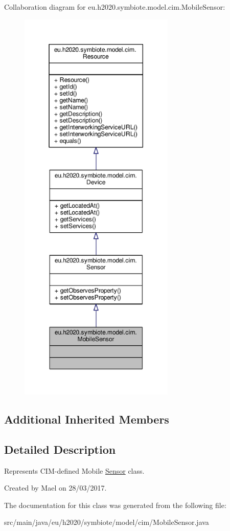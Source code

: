 Collaboration diagram for eu.\+h2020.\+symbiote.\+model.\+cim.\+Mobile\+Sensor\+:
\nopagebreak
\begin{figure}[H]
\begin{center}
\leavevmode
\includegraphics[height=550pt]{classeu_1_1h2020_1_1symbiote_1_1model_1_1cim_1_1MobileSensor__coll__graph}
\end{center}
\end{figure}
\subsection*{Additional Inherited Members}


\subsection{Detailed Description}
Represents C\+I\+M-\/defined Mobile \hyperlink{classeu_1_1h2020_1_1symbiote_1_1model_1_1cim_1_1Sensor}{Sensor} class.

Created by Mael on 28/03/2017. 

The documentation for this class was generated from the following file\+:\begin{DoxyCompactItemize}
\item 
src/main/java/eu/h2020/symbiote/model/cim/Mobile\+Sensor.\+java\end{DoxyCompactItemize}
